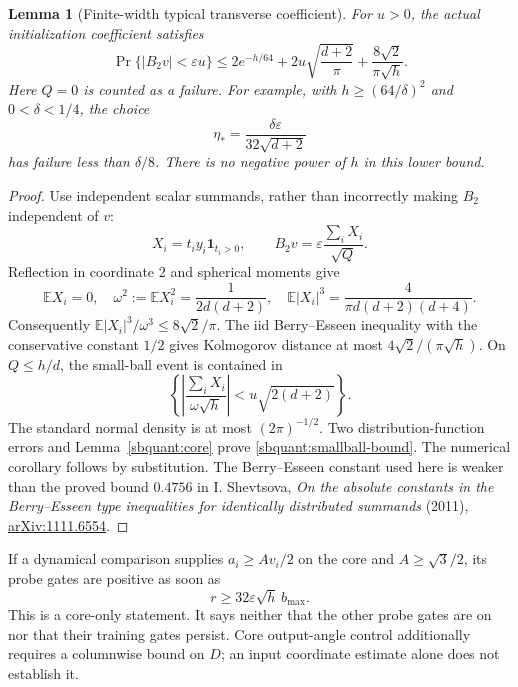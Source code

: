 \documentclass{article} %
\theoremstyle{plain}
\newtheorem{lemma}[theorem]{Lemma}
\theoremstyle{definition}
\theoremstyle{remark}
\begin{document}
\begin{lemma}[Finite-width typical transverse coefficient]
\label{sbquant:smallball}
For $u>0$, the actual initialization coefficient satisfies
\begin{equation}\label{sbquant:smallball-bound}
 \Pr\{|B_2v|<\varepsilon u\}
 \le 2e^{-h/64}
 +2u\sqrt{\frac{d+2}{\pi}}
 +\frac{8\sqrt2}{\pi\sqrt h}.
\end{equation}
Here $Q=0$ is counted as a failure. For example, with
$h\ge(64/\delta)^2$ and $0<\delta<1/4$, the choice
\[
 \eta_* =\frac{\delta\varepsilon}{32\sqrt{d+2}}
\]
has failure less than $\delta/8$. There is no negative power of $h$ in
this lower bound.
\end{lemma}
\begin{proof}
Use independent scalar summands, rather than incorrectly making $B_2$
independent of $v$:
\[
 X_i=t_i y_i\mathbf1_{t_i>0},\qquad
 B_2v=\varepsilon\frac{\sum_iX_i}{\sqrt Q}.
\]
Reflection in coordinate 2 and spherical moments give
\[
 \mathbb EX_i=0,\quad
 \omega^2:=\mathbb EX_i^2=\frac1{2d(d+2)},\quad
 \mathbb E|X_i|^3=\frac4{\pi d(d+2)(d+4)}.
\]
Consequently $\mathbb E|X_i|^3/\omega^3\le8\sqrt2/\pi$.
The iid Berry--Esseen inequality with the conservative constant $1/2$
gives Kolmogorov distance at most $4\sqrt2/(\pi\sqrt h)$.
On $Q\le h/d$, the small-ball event is contained in
\[
 \left\{\left|\frac{\sum_iX_i}{\omega\sqrt h}\right|
 <u\sqrt{2(d+2)}\right\}.
\]
The standard normal density is at most $(2\pi)^{-1/2}$.
Two distribution-function errors and Lemma~\ref{sbquant:core} prove
\eqref{sbquant:smallball-bound}. The numerical corollary follows by
substitution. The Berry--Esseen constant used here is weaker than the
proved bound $0.4756$ in I. Shevtsova,
\emph{On the absolute constants in the Berry--Esseen type inequalities
for identically distributed summands} (2011),
\href{https://arxiv.org/abs/1111.6554}{arXiv:1111.6554}.
\end{proof}

If a dynamical comparison supplies $a_i\ge Av_i/2$ on the core and
$A\ge\sqrt3/2$, its probe gates are positive as soon as
\begin{equation}\label{sbquant:core-radius}
 r\ge32\varepsilon\sqrt h\,b_{\max}.
\end{equation}
This is a core-only statement. It says neither that the other probe
gates are on nor that their training gates persist. Core output-angle
control additionally requires a columnwise bound on $D$; an input
coordinate estimate alone does not establish it.
\end{document}
